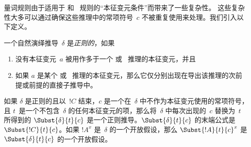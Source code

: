 \documentclass[../../../include/open-logic-section]{subfiles}
\begin{document}



量词规则由于适用于 \Elim{\lexists} 和~\Intro{\lforall} 规则的“本征变元条件”而带来了一些复杂性。
这些复杂性大多可以通过确保这些推理中的常项符号~$c$ 不被重复使用来处理。我们引入以下定义。

\begin{defn}
一个自然演绎推导~$\delta$ 是\emph{正则的}，如果
\begin{enumerate}
  \item 没有本征变元~$a$ 被用作多于一个 \Elim{\lexists} 或~\Intro{\lforall} 推理的本征变元，并且
  \item 如果 $a$ 是某个 \Elim{\lexists} 或~\Intro{\lforall} 推理的本征变元，那么它仅分别出现在导出该推理的次前提或前提的直接子推导中。
\end{enumerate}
\end{defn}

\begin{lem} 如果 $\delta$ 是正则的且以~$!C$ 结束，$c$ 是一个在~$\delta$ 中不作为本征变元使用的常项符号，且 $t$~是一个不包含~$\delta$ 的任何本征变元的项，那么将~$\delta$ 中每次出现的~$c$ 替换为~$t$ 所得到的 $\Subst{\delta}{t}{c}$ 是一个正则推导。$\Subst{\delta}{t}{c}$ 的末端公式是 $\Subst{!C}{t}{c}$。如果 $!A^x$ 是~$\delta$ 的一个开放假设，那么 $\Subst{!A}{t}{c}^x$ 是 $\Subst{\delta}{t}{c}$ 的一个开放假设。
\end{lem}
\end{document}
